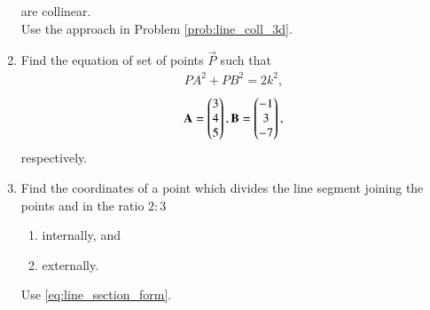 \begin{enumerate}[label=\arabic*.,ref=\thesubsection.\theenumi]
are collinear.
%
\\
\solution Use the approach in Problem \eqref{prob:line_coll_3d}.
%
\item Find the equation of set of points $\vec{P}$ such that
\begin{align}
PA^2+PB^2 =2k^2,
\end{align}
%
\begin{align}
\mathbf{A} = \begin{pmatrix}3\\4 \\5\end{pmatrix},
\mathbf{B} = \begin{pmatrix}-1\\3 \\-7\end{pmatrix},
\end{align}
%
respectively.
%
\item Find the coordinates of a point which divides the line segment joining the points  and  in the ratio $2:3$
\begin{enumerate}
\item internally, and
\item externally.
\end{enumerate}
%
\solution Use \eqref{eq:line_section_form}.


\end{enumerate}
